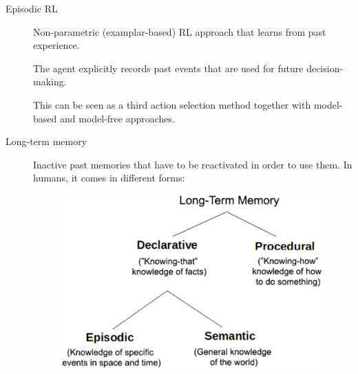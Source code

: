 \begin{description}
    \item[Episodic RL] 
        Non-parametric (examplar-based) RL approach that learns from past experience.

        The agent explicitly records past events that are used for future decision-making.

        \begin{remark}
            This can be seen as a third action selection method together with model-based and model-free approaches.
        \end{remark}

    \item[Long-term memory] 
        Inactive past memories that have to be reactivated in order to use them. In humans, it comes in different forms:

        \begin{figure}[H]
            \centering
            \includegraphics[width=0.35\linewidth]{./img/long_term_memory.png}
        \end{figure}


\end{description}
